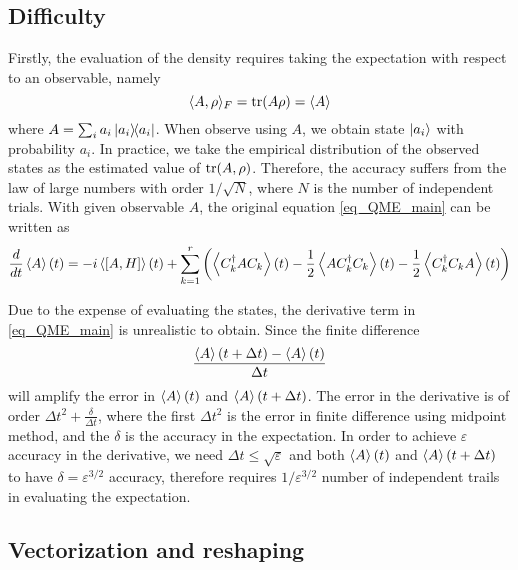 \documentclass[10pt]{article}  %
\theoremstyle{plain}
\numberwithin{equation}{section}
\newcommand{\innerp}[1]{\langle{#1}\rangle}
\def\mV{\mathcal{V}}
\def\mB{\mathcal{B}}
\def\R{\mathbb{R}}
\begin{document}
\subsection{Difficulty}
Firstly, the evaluation of the density requires taking the expectation with respect to an observable, namely
$$ \innerp{A, \rho}_F = \tr(A \rho) = \expval{A}$$
where $A = \sum_i a_i \ketbra{a_i}{a_i}$. When observe using $A$, we obtain state $\ket{a_i}$ with probability $a_i$. In practice, we take the empirical distribution of the observed states as the estimated value of $\tr(A, \rho)$. Therefore, the accuracy suffers from the law of large numbers with order $1/\sqrt{N}$, where $N$ is the number of independent trials. With given observable $A$, the original equation \eqref{eq_QME_main} can be written as 
\begin{equation}
	\frac{d}{dt} \expval{A}(t) = -i\expval{[A, H]}(t) + \sum_{k = 1}^r \left(\expval{C_k^\dagger A C_k}(t) - \frac{1}{2} \expval{A C_k^\dagger C_k} (t) - \frac{1}{2} \expval{C_k^\dagger C_k A}(t) \right)
\end{equation}



Due to the expense of evaluating the states, the derivative term in \eqref{eq_QME_main} is unrealistic to obtain. Since the finite difference 
$$ \frac{\expval{A}(t + \Delta t) - \expval{A}(t)}{\Delta t} $$ 
will amplify the error in $\expval{A}(t)$ and $\expval{A}(t + \Delta t)$. The error in the derivative is of order $\Delta t^2 + \frac{\delta}{\Delta t}$, where the first $\Delta t^2 $ is the error in finite difference using midpoint method, and the $\delta$ is the accuracy in the expectation. In order to achieve $\varepsilon$ accuracy in the derivative, we need $\Delta t \leq \sqrt{\varepsilon}$ and both $\expval{A}(t)$ and $\expval{A}(t + \Delta t)$ to have $\delta = \varepsilon^{3/2}$ accuracy, therefore requires $1/\varepsilon^{3/2}$ number of independent trails in evaluating the expectation.

\subsection{Vectorization and reshaping}
\end{document}
